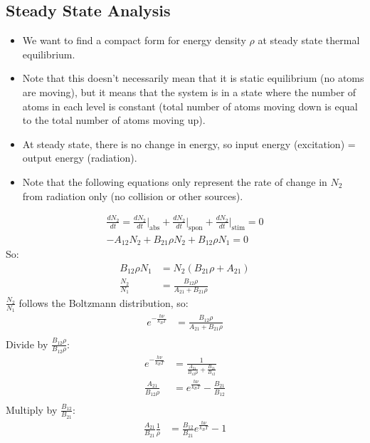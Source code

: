 \documentclass[11pt]{article}
\begin{document}
\subsection{Steady State Analysis}
\begin{itemize}
    \item We want to find a compact form for energy density $\rho$ at steady state thermal equilibrium.
    \item  Note that this doesn't necessarily mean that it is static equilibrium (no atoms are moving), but it means that the system is in a state where the number of atoms in each level is constant (total number of atoms moving down is equal to the total number of atoms moving up).
    \item At steady state, there is no change in energy, so input energy (excitation) = output energy (radiation). 
    \item Note that the following equations only represent the rate of change in $N_2$ from radiation only (no collision or other sources).
\end{itemize}
\begin{align*}
    \frac{dN_2}{dt} = \frac{dN_2}{dt} \bigg|_{\text{abs}} + \frac{dN_2}{dt} \bigg|_{\text{spon}} + \frac{dN_2}{dt} \bigg|_{\text{stim}} = 0 \\
    -A_{12} N_2 + B_{21} \rho N_2 + B_{12} \rho N_1 = 0 
\end{align*}
So:
\begin{align*}
    B_{12} \rho N_1 &= N_2 (B_{21} \rho + A_{21}) \\
    \frac{N_2}{N_1} &= \frac{B_{12} \rho}{A_{21} + B_{21} \rho}
\end{align*}
$\frac{N_2}{N_1}$ follows the Boltzmann distribution, so:
\begin{align*}
    e^{-\frac{h\nu}{k_BT}} &= \frac{B_{12} \rho}{A_{21} + B_{21} \rho} \\
\end{align*}
Divide by $\frac{B_{12} \rho}{B_{12} \rho}$:
\begin{align*}
    e^{-\frac{h\nu}{k_BT}} &= \frac{1}{\frac{A_{21}}{B_{12} \rho} + \frac{B_{21}}{B_{12}}} \\
    \frac{A_{21}}{B_{12} \rho} &= e^{\frac{h\nu}{k_BT}} - \frac{B_{21}}{B_{12}} \\
\end{align*}
Multiply by $\frac{B_{12}}{B_{21}}$:
\begin{align*}
    \frac{A_{21}}{B_{21}} \frac{1}{\rho} &= \frac{B_{12}}{B_{21}} e^{\frac{h\nu}{k_BT}} - 1 
\end{align*}
\end{document}
